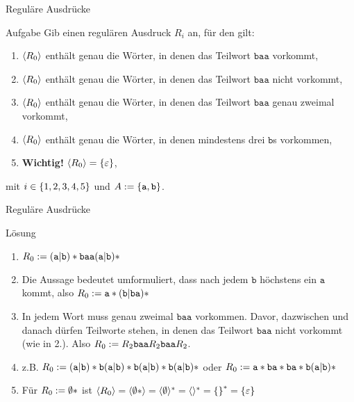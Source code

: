 \begin{frame}{Reguläre Ausdrücke}
\begin{exampleblock}{Aufgabe}
	Gib einen regulären Ausdruck $R_i$ an, für den gilt:
	\begin{enumerate}
		\item $\lang{R_\theenumi}$ enthält genau die Wörter, in denen das Teilwort $\texttt{baa}$ vorkommt,
		\item $\lang{R_\theenumi}$ enthält genau die Wörter, in denen das Teilwort $\texttt{baa}$ nicht vorkommt,
		\item $\lang{R_\theenumi}$ enthält genau die Wörter, in denen das Teilwort $\texttt{baa}$ genau zweimal vorkommt,
		\item $\lang{R_\theenumi}$ enthält genau die Wörter, in denen mindestens drei $\texttt{b}$s vorkommen,
		\item \textbf{Wichtig!} $\lang{R_\theenumi} = \set{\varepsilon}$,
	\end{enumerate}
	mit $i \in \left\{ 1,2,3,4,5 \right\}$ und $A := \left\{ \texttt{a}, \texttt{b} \right\}$.
\end{exampleblock}
\end{frame}

\begin{frame}{Reguläre Ausdrücke}
\newcommand{\any}{(\texttt{a} | \texttt{b}) *}
\begin{block}{Lösung}
	\begin{enumerate}
		\item $R_\theenumi := \any \texttt{baa} \any $
		\item Die Aussage bedeutet umformuliert, dass nach jedem $\texttt{b}$ höchstens ein $\texttt{a}$ kommt, also $R_\theenumi := \texttt{a} * (\texttt{b} | \texttt{ba} ) * $
		\item In jedem Wort muss genau zweimal $\texttt{baa}$ vorkommen. Davor, dazwischen und danach dürfen Teilworte stehen, in denen das Teilwort $\texttt{baa}$ nicht vorkommt (wie in 2.). Also $R_\theenumi := R_2 \texttt{baa} R_2 \texttt{baa} R_2$.
		\item z.B. $R_\theenumi := \any \texttt{b} \any \texttt{b}\any \texttt{b} \any $
		oder $R_\theenumi := \texttt{a} * \texttt{ba} * \texttt{ba} * \texttt{b} \any$
		\item Für $R_\theenumi := \emptyset *$ ist $\lang{R_\theenumi} = \lang{\emptyset *} = \lang{\emptyset}^* = \lang{}^* = \set{}^* = \set{\varepsilon}$
	\end{enumerate}
\end{block}
\end{frame}

